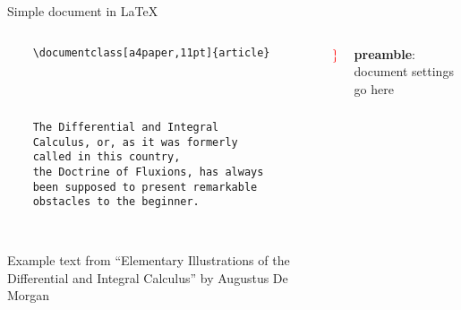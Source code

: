 \copyrightTim

\begin{frame}[fragile, t]{Simple document in \LaTeX}
	\begin{columns}
        \begin{column}{0.5\textwidth}
	\begin{verbatim} 
	\documentclass[a4paper,11pt]{article}

		
	

	The Differential and Integral 
	Calculus, or, as it was formerly 
	called in this country, 
	the Doctrine of Fluxions, has always 
	been supposed to present remarkable 
	obstacles to the beginner.

	
	\end{verbatim}

	Example text from ``Elementary Illustrations of the Differential and Integral Calculus'' by Augustus De Morgan
\end{column}
\begin{column}{0.05\textwidth}
	{\Huge \textcolor{red}{ \} } }
	\\[2cm]
	\phantom{{\Huge \textcolor{red}{ \} } }}
	
\end{column}
\begin{column}{0.3\textwidth}
	\textbf{preamble}: document settings go here
	\\[2cm]
\end{column}
\end{columns}

\end{frame}
